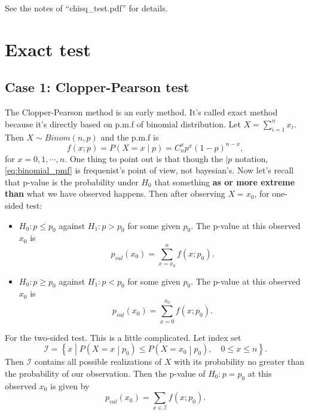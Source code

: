\documentclass[a4paper,12pt]{article}
\begin{document}
See the notes of ``chisq\_test.pdf'' for details.


\section{Exact test}
\label{sec:exact-test}

\subsection{Case 1: Clopper-Pearson test}
\label{sec:case-1:-clopper}

The Clopper-Pearson method is an early method. It's called exact method because it's directly based on p.m.f of binomial distribution. Let $X = \sum\limits_{i = 1}^nx_i$. Then $X\sim Binom(n, p)$ and the p.m.f is
\begin{equation}
  \label{eq:binomial_pmf}
  f\left(x;p\right) = P\left(X = x\middle|p\right) = C_n^xp^x\left(1 - p\right)^{n - x}
  ,
\end{equation}
for $x = 0, 1, \cdots, n$. One thing to point out is that though the $|p$ notation, \eqref{eq:binomial_pmf} is frequenist's point of view, not bayesian's. Now let's recall that p-value is the probability under $H_0$ that something \textbf{as or more extreme than} what we have observed happens. Then after observing $X = x_0$, for one-sided test:
\begin{itemize}
\item $H_0: p \leq p_0$ against $H_1: p > p_0$ for some given $p_0$. The p-value at this observed $x_0$ is
  \begin{equation}
    \label{eq:clopper_pval_h0_leq}
    p_{val}\left(x_0\right) = \sum\limits_{x = x_0}^nf\left(x;p_0\right)
    .
  \end{equation}

\item $H_0: p \geq p_0$ against $H_1: p < p_0$ for some given $p_0$. The p-value at this observed $x_0$  is
  \begin{equation}
    \label{eq:clopper_pval_h0_geq}
    p_{val}\left(x_0\right) = \sum\limits_{x = 0}^{x_0}f\left(x;p_0\right)
    .    
  \end{equation}

\end{itemize}
For the two-sided test. This is a little complicated. Let index set
\[
  \mathcal{I} = \left\{
    x\middle|
    P\left(X = x\middle|p_0\right) \leq P\left(X = x_0\middle|p_0\right)
    ,\quad
    0\leq x \leq n
  \right\}
  .
\]
Then $\mathcal{I}$ contains all possible realizations of $X$ with its probability no greater than the probability of our observation. Then the p-value of $H_0: p = p_0$  at this observed $x_0$ is given by
\begin{equation}
  \label{eq:clopper_pval_h0_twosided}
  p_{val}\left(x_0\right) = \sum\limits_{x\in\mathcal{I}}f\left(x;p_0\right)
  . 
\end{equation}
\end{document}
